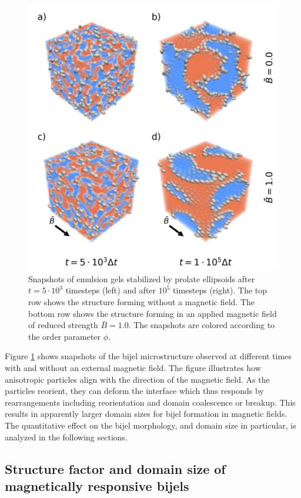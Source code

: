 \begin{figure}
    \centering
    \includegraphics[width=0.5\columnwidth]{figures/results/paper1/microstructure_viz.png}
    \caption{Snapshots of emulsion gels stabilized by prolate ellipsoids after $t=5\cdot10^3$ timesteps (left) and after $10^5$ timesteps (right). The top row shows the structure forming without a magnetic field. 
             The bottom row shows the structure forming in an applied magnetic field of reduced strength $\bar{B}=1.0$. The snapshots are colored according to the order parameter $\phi$.}
    \label{fig:microstructure_viz}
\end{figure}

Figure \ref{fig:microstructure_viz} shows snapshots of the bijel
microstructure observed at different times with and without an external
magnetic field. The figure illustrates how anisotropic particles align
with the direction of the magnetic field. As the particles reorient,
they can deform the interface which thus responds by rearrangements
including reorientation and domain coalescence or breakup. This results
in apparently larger domain sizes for bijel formation in magnetic
fields. The quantitative effect on the bijel morphology, and domain size
in particular, is analyzed in the following sections.

\subsection{Structure factor and domain size of magnetically responsive bijels}

